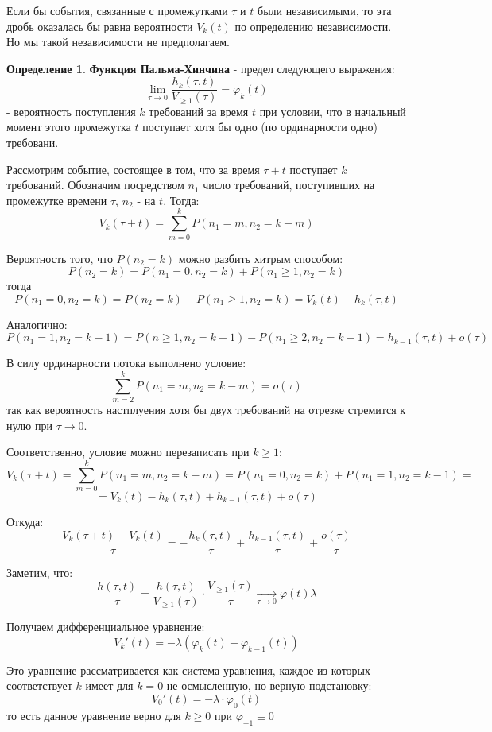 \documentclass[aps,%
12pt,%
final,%
oneside,
onecolumn,%
musixtex, %
superscriptaddress,%
centertags]{article} %
\theoremstyle{plain}
\theoremstyle{definition}
\newtheorem{definition}{Определение}[subsection]
\theoremstyle{remark}
\begin{document}
Если бы события, связанные с промежутками $\tau$ и $t$ были независимыми, то эта дробь оказалась бы равна вероятности $V_k(t)$ по определению независимости. Но мы такой независимости не предполагаем.

\begin{definition}
	\textbf{Функция Пальма-Хинчина} - предел следующего выражения:
	$$\lim\limits_{\tau \to 0} \frac{h_k(\tau,t)}{V_{\geq 1}(\tau)} = \varphi_k(t)$$
	- вероятность поступления $k$ требований за время $t$ при условии, что в начальный момент этого промежутка $t$ поступает хотя бы одно (по ординарности одно) требовани.
\end{definition}

Рассмотрим событие, состоящее в том, что за время $\tau+t$ поступает $k$ требований. Обозначим посредством $n_1$ число требований, поступивших на промежутке времени $\tau$, $n_2$ - на $t$. Тогда:
$$V_k(\tau+t) = \sum\limits_{m=0}^k P(n_1=m, n_2 = k-m)$$

Вероятность того, что $P(n_2=k)$ можно разбить хитрым способом:
$$P(n_2=k) = P(n_1=0,n_2=k) + P(n_1\geq 1,n_2=k)$$ тогда
$$P(n_1=0,n_2=k) = P(n_2=k) - P(n_1\geq 1,n_2=k) = V_k(t) - h_k(\tau,t)$$

Аналогично:
$$P(n_1=1,n_2=k-1) = P(n\geq 1, n_2=k-1) - P(n_1\geq 2, n_2 = k-1) = h_{k-1}(\tau,t) + o(\tau)$$

В силу ординарности потока выполнено условие:
$$\sum\limits_{m=2}^kP(n_1=m,n_2=k-m) = o(\tau)$$
так как вероятность настплуения хотя бы двух требований на отрезке стремится к нулю при $\tau \to 0$.

Соответственно, условие можно перезаписать при $k \geq 1$:
$$V_k(\tau+t) = \sum\limits_{m=0}^k P(n_1=m, n_2 = k-m) = P(n_1=0,n_2=k) +  P(n_1=1,n_2=k-1) = $$
$$ = V_k(t) - h_k(\tau,t) +  h_{k-1}(\tau,t) + o(\tau)$$

Откуда:
$$\frac{V_k(\tau+t)-V_k(t)}{\tau} = - \frac{h_k(\tau,t)}{\tau}  + \frac{ h_{k-1}(\tau,t)}{\tau} + \frac{o(\tau)}{\tau}$$

Заметим, что:
$$\frac{h(\tau,t)}{\tau}  = \frac{h(\tau,t)}{V_{\geq 1}(\tau)} \cdot \frac{V_{\geq 1}(\tau)}{\tau} \xrightarrow[\tau \to 0]{}\varphi(t)\lambda$$

Получаем дифференциальное уравнение:
$$V_k'(t) = -\lambda(\varphi_k(t) - \varphi_{k-1}(t))$$

Это уравнение рассматривается как система уравнения, каждое из которых соответствует $k$ имеет для $k=0$ не осмысленную, но верную подстановку:
$$V_0'(t) = -\lambda \cdot \varphi_0(t)$$
то есть данное уравнение верно для $k \geq 0$ при $\varphi_{-1} \equiv 0$
\end{document}
